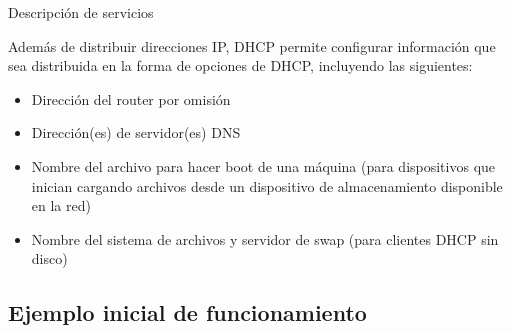 \begin{frame}{Descripción de servicios} %

   Además de distribuir direcciones IP, DHCP permite configurar información que
   sea distribuida en la forma de opciones de DHCP, incluyendo las siguientes:

   \begin{itemize}
       \item Dirección del router por omisión
       \item Dirección(es) de servidor(es) DNS
       \item Nombre del archivo para hacer boot de una máquina (para dispositivos que inician
       cargando archivos desde un dispositivo de almacenamiento disponible en
       la red)
       \item Nombre del sistema de archivos y servidor de swap (para clientes
       DHCP sin disco)
   \end{itemize}

\end{frame}

\subsection{Ejemplo inicial de funcionamiento} %
\label{sub:Ejemplo inicial de funcionamiento}


